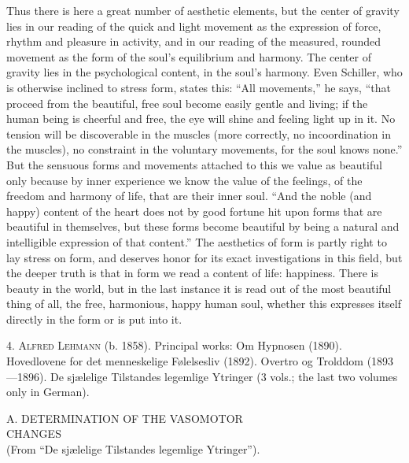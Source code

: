 \documentclass[12pt,a4paper,openany]{book}
\newcommand{\opage}[1]{\marginnote{\footnotesize\textit{[#1]}}}
\newcommand{\excerpthead}[1]{\par\bigskip\begin{center}#1\end{center}\nopagebreak\smallskip}
\newenvironment{intro}{\par}{\par}
\begin{document}
Thus there is here a great number of aesthetic elements,
but the center of gravity lies in our reading of the quick
and light movement as the expression of force, rhythm and pleasure in
activity, and in our reading of the measured, rounded
movement as the form of the soul's equilibrium and harmony.
The center of gravity lies in the psychological content, in the soul's
harmony. Even Schiller, who is otherwise inclined to stress
form, states this: ``All movements,'' he says, ``that
proceed from the beautiful, free soul become easily gentle and living;
if the human being is cheerful and free, the eye will shine and feeling light up
in it. No tension will be discoverable in the muscles
(more correctly, no incoordination in the muscles), no
constraint in the voluntary movements, for the soul knows none.''
But the sensuous forms and movements attached to this we value
as beautiful only because by inner experience we know
the value of the feelings, of the freedom and harmony of life, that are
their inner soul. ``And the noble (and happy) content of the heart
does not by good fortune hit upon forms that are beautiful in themselves, but
these forms become beautiful by being a natural and intelligible
expression of that content.'' The aesthetics of form is partly
right to lay stress on form, and deserves honor for its exact
investigations in this field, but the deeper
truth is that in form we read a content of life: happiness.
There is beauty in the world, but in the last instance it is read out
of the most beautiful thing of all, the free, harmonious, happy
human soul, whether this expresses itself directly in the form
or is put into it.

\begin{intro}

\setcounter{footnote}{0}%
\opage{276}4. \textsc{Alfred Lehmann} (b. 1858). Principal works: Om Hypnosen
(1890). Hovedlovene for det menneskelige Følelsesliv (1892).
Overtro og Trolddom (1893---1896). De sjælelige Tilstandes legemlige
Ytringer (3 vols.; the last two volumes only in German).
\end{intro}

\excerpthead{A. DETERMINATION OF THE VASOMOTOR \\ CHANGES \\ (From ``De sjælelige Tilstandes legemlige Ytringer'').}
\end{document}
